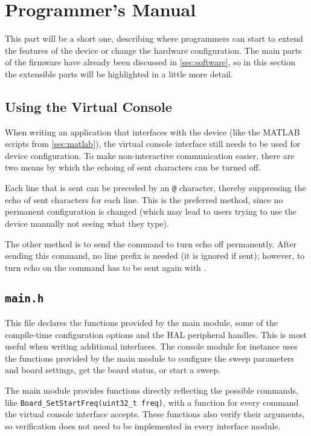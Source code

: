 \chapter{Programmer's Manual} \label{sec:api}

This part will be a short one, describing where programmers can start to extend the features of the device or
change the hardware configuration.
The main parts of the firmware have already been discussed in \autoref{sec:software}, so in this section
the extensible parts will be highlighted in a little more detail.


\section{Using the Virtual Console}

When writing an application that interfaces with the device (like the MATLAB scripts from \autoref{sec:matlab}),
the virtual console interface still needs to be used for device configuration.
To make non-interactive communication easier, there are two means by which the echoing of sent characters can be turned
off.

Each line that is sent can be preceded by an \texttt{@} character, thereby suppressing the echo of sent characters
for each line. This is the preferred method, since no permanent configuration is changed (which may lead to users
trying to use the device manually not seeing what they type).

The other method is to send the command  to turn echo off permanently. After sending
this command, no line prefix is needed (it is ignored if sent); however, to turn echo on the command has to be sent
again with .


\section{\texttt{main.h}}

This file declares the functions provided by the main module, some of the compile-time configuration options and the
HAL peripheral handles. This is most useful when writing additional interfaces. The console module for instance uses
the functions provided by the main module to configure the sweep parameters and board settings, get the board status,
or start a sweep.

The main module provides functions directly reflecting the possible commands, like
\verb!Board_SetStartFreq(uint32_t freq)!, with a function for every command the virtual console interface accepts.
These functions also verify their arguments, so verification does not need to be implemented in every interface module.

